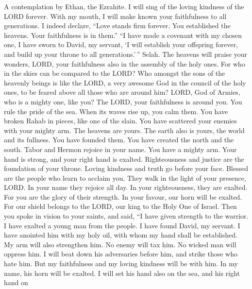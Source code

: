 A contemplation by Ethan, the Ezrahite.  I will sing of the
loving kindness of the LORD forever. With my mouth, I will make known
your faithfulness to all generations.  I indeed declare,
``Love stands firm forever. You established the heavens. Your
faithfulness is in them.''  ``I have made a covenant with my
chosen one, I have sworn to David, my servant,  `I will
establish your offspring forever, and build up your throne to all
generations.'\,'' Selah.  The heavens will praise your
wonders, LORD, your faithfulness also in the assembly of the holy ones.
 For who in the skies can be compared to the LORD? Who
amongst the sons of the heavenly beings is like the LORD,  a
very awesome God in the council of the holy ones, to be feared above all
those who are around him?  LORD, God of Armies, who is a
mighty one, like you? The LORD, your faithfulness is around you.
 You rule the pride of the sea. When its waves rise up, you
calm them.  You have broken Rahab in pieces, like one of
the slain. You have scattered your enemies with your mighty arm.
 The heavens are yours. The earth also is yours, the world
and its fullness. You have founded them.  You have created
the north and the south. Tabor and Hermon rejoice in your name.
 You have a mighty arm. Your hand is strong, and your right
hand is exalted.  Righteousness and justice are the
foundation of your throne. Loving kindness and truth go before your
face.  Blessed are the people who learn to acclaim you.
They walk in the light of your presence, LORD.  In your
name they rejoice all day. In your righteousness, they are exalted.
 For you are the glory of their strength. In your favour,
our horn will be exalted.  For our shield belongs to the
LORD, our king to the Holy One of Israel.  Then you spoke
in vision to your saints, and said, ``I have given strength to the
warrior. I have exalted a young man from the people.  I
have found David, my servant. I have anointed him with my holy oil,
 with whom my hand shall be established. My arm will also
strengthen him.  No enemy will tax him. No wicked man will
oppress him.  I will beat down his adversaries before him,
and strike those who hate him.  But my faithfulness and my
loving kindness will be with him. In my name, his horn will be exalted.
 I will set his hand also on the sea, and his right hand on
